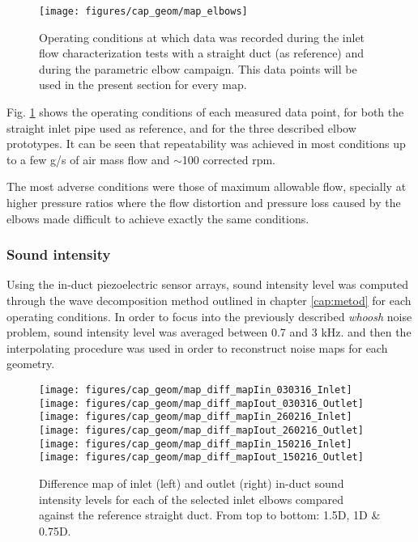 \begin{figure}[bht!]
\centering
\texttt{[image: figures/cap\_geom/map\_elbows]}
\caption{Operating conditions at which data was recorded during the inlet flow characterization tests with a straight duct (as reference) and during the parametric elbow campaign. This data points will be used in the present section for every map.}
\label{fig:map_elbows}
\end{figure}

Fig. \ref{fig:map_elbows} shows the operating conditions of each measured data point, for both the straight inlet pipe used as reference, and for the three described elbow prototypes. It can be seen that repeatability was achieved in most conditions up to a few g/s of air mass flow and $\sim$100 corrected rpm. 

The most adverse conditions were those of maximum allowable flow, specially at higher pressure ratios where the flow distortion and pressure loss caused by the elbows made difficult to achieve exactly the same conditions.

\subsubsection{Sound intensity}

Using the in-duct piezoelectric sensor arrays, sound intensity level was computed through the wave decomposition method outlined in chapter \ref{cap:metod} for each operating conditions. In order to focus into the previously described \emph{whoosh} noise problem, sound intensity level was averaged between 0.7 and 3 kHz. and then the interpolating procedure was used in order to reconstruct noise maps for each geometry.

\begin{figure}[thb!]
\centering

\texttt{[image: figures/cap\_geom/map\_diff\_mapIin\_030316\_Inlet]}\hspace{4mm}
\texttt{[image: figures/cap\_geom/map\_diff\_mapIout\_030316\_Outlet]}\\[4mm]

\texttt{[image: figures/cap\_geom/map\_diff\_mapIin\_260216\_Inlet]}\hspace{4mm}
\texttt{[image: figures/cap\_geom/map\_diff\_mapIout\_260216\_Outlet]}\\[4mm]

\texttt{[image: figures/cap\_geom/map\_diff\_mapIin\_150216\_Inlet]}\hspace{4mm}
\texttt{[image: figures/cap\_geom/map\_diff\_mapIout\_150216\_Outlet]}\\[4mm]

\caption{Difference map of inlet (left) and outlet (right) in-duct sound intensity levels for each of the selected inlet elbows compared against the reference straight duct. From top to bottom: 1.5D, 1D \& 0.75D.}
\label{fig:map_diff_in_out}
\end{figure}

